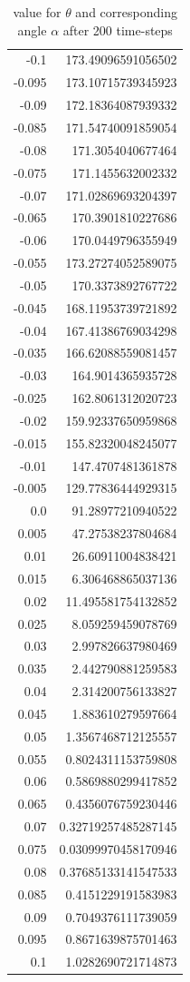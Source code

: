 \documentclass{mimosis}
\begin{document}
\begin{longtable}{rr}
\caption{\label{angle-table}value for \(\theta\) and corresponding angle \(\alpha\) after 200 time-steps}
\\
-0.1 & 173.49096591056502\\
-0.095 & 173.10715739345923\\
-0.09 & 172.18364087939332\\
-0.085 & 171.54740091859054\\
-0.08 & 171.3054040677464\\
-0.075 & 171.1455632002332\\
-0.07 & 171.02869693204397\\
-0.065 & 170.3901810227686\\
-0.06 & 170.0449796355949\\
-0.055 & 173.27274052589075\\
-0.05 & 170.3373892767722\\
-0.045 & 168.11953739721892\\
-0.04 & 167.41386769034298\\
-0.035 & 166.62088559081457\\
-0.03 & 164.9014365935728\\
-0.025 & 162.8061312020723\\
-0.02 & 159.92337650959868\\
-0.015 & 155.82320048245077\\
-0.01 & 147.4707481361878\\
-0.005 & 129.77836444929315\\
0.0 & 91.28977210940522\\
0.005 & 47.27538237804684\\
0.01 & 26.60911004838421\\
0.015 & 6.306468865037136\\
0.02 & 11.495581754132852\\
0.025 & 8.059259459078769\\
0.03 & 2.997826637980469\\
0.035 & 2.442790881259583\\
0.04 & 2.314200756133827\\
0.045 & 1.883610279597664\\
0.05 & 1.3567468712125557\\
0.055 & 0.8024311153759808\\
0.06 & 0.5869880299417852\\
0.065 & 0.4356076759230446\\
0.07 & 0.32719257485287145\\
0.075 & 0.03099970458170946\\
0.08 & 0.37685133141547533\\
0.085 & 0.4151229191583983\\
0.09 & 0.7049376111739059\\
0.095 & 0.8671639875701463\\
0.1 & 1.0282690721714873\\
\end{longtable}
\end{document}

